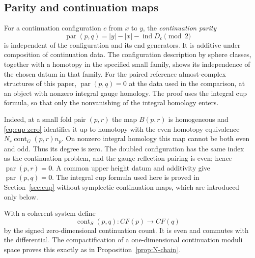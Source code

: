 \documentclass[11pt]{amsart}
\theoremstyle{definition}
\theoremstyle{remark}
\theoremstyle{plain}
\numberwithin{equation}{section}
\newcommand{\CF}{\mathit{CF}}
\newcommand{\ind}{\operatorname{ind}}
\newcommand{\cont}{\operatorname{cont}}
\begin{document}
\subsection{Parity and continuation maps}
For a continuation configuration $c$ from $x$
to $y$, the \emph{continuation parity}
\[
 \operatorname{par}(p,q)=|y|-|x|-\ind D_c\pmod2
\]
is independent of the configuration and its
end generators. It is additive under
composition of continuation data. The
configuration description by sphere classes, together with a
homotopy in the specified small family, shows its independence of
the chosen datum in that family.
For the paired reference almost-complex structures of this paper,
$\operatorname{par}(p,q)=0$ at the data used in the comparison,
at an object with nonzero integral gauge homology.
The proof uses the integral cup formula, so that
only the nonvanishing of the integral homology
enters.

Indeed, at a small fold pair $(p,r)$ the map
$B(p,r)$ is homogeneous and
\eqref{eq:cup-zero} identifies it up to
homotopy with the even homotopy equivalence
$N_r\cont_G(p,r)n_p$. On nonzero integral
homology this map cannot be both even and
odd. Thus its degree is zero. The doubled
configuration has the same index as the
continuation problem, and the gauge
reflection pairing is even; hence
$\operatorname{par}(p,r)=0$. A common upper height datum
and additivity give $\operatorname{par}(p,q)=0$. The integral cup formula used here is proved in Section~\ref{sec:cup} without symplectic continuation maps, which are introduced only below.

With a coherent system define
\[
 \cont_S(p,q):\CF(p)\longrightarrow\CF(q)
\]
by the signed zero-dimensional continuation
count. It is even and commutes with the
differential. The compactification of a
one-dimensional continuation moduli space
proves this exactly as in
Proposition~\ref{prop:N-chain}.
\end{document}
